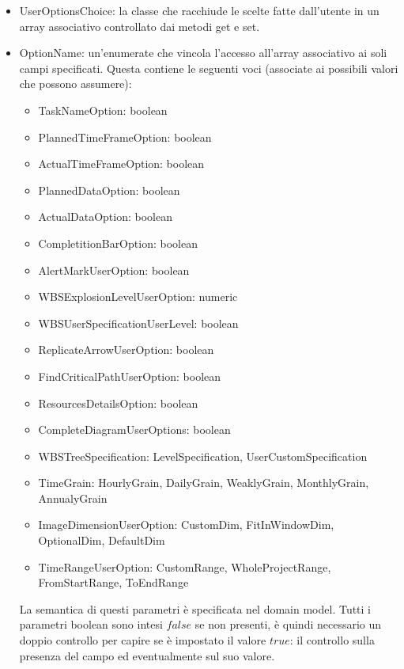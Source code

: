 \documentclass[a4paper, 12pt]{report}
\begin{document}
\begin{itemize}
	\item UserOptionsChoice: la classe che racchiude le scelte fatte dall'utente in un array associativo controllato dai metodi get e set.
	\item OptionName: un'enumerate che vincola l'accesso all'array associativo ai soli campi specificati. Questa contiene le seguenti voci (associate ai possibili valori che possono assumere):
	\begin{itemize}
		\item TaskNameOption: boolean		
		\item PlannedTimeFrameOption: boolean
		\item ActualTimeFrameOption: boolean
		\item PlannedDataOption: boolean
		\item ActualDataOption: boolean
		\item CompletitionBarOption: boolean
		\item AlertMarkUserOption: boolean
		\item WBSExplosionLevelUserOption: numeric
		\item WBSUserSpecificationUserLevel: boolean
		\item ReplicateArrowUserOption: boolean
		\item FindCriticalPathUserOption: boolean
		\item ResourcesDetailsOption: boolean
		\item CompleteDiagramUserOptions: boolean
		\item WBSTreeSpecification: LevelSpecification, UserCustomSpecification
		\item TimeGrain: HourlyGrain, DailyGrain, WeaklyGrain, MonthlyGrain, AnnualyGrain
		\item ImageDimensionUserOption: CustomDim, FitInWindowDim, OptionalDim, DefaultDim 
		\item TimeRangeUserOption: CustomRange, WholeProjectRange, FromStartRange, ToEndRange
	\end{itemize}
	La semantica di questi parametri \`e specificata nel domain model. Tutti i parametri boolean sono intesi $false$ se non presenti, \`e quindi necessario un doppio controllo per capire se \`e impostato il valore $true$: il controllo sulla presenza del campo ed eventualmente sul suo valore.
\end{itemize}
\end{document}
